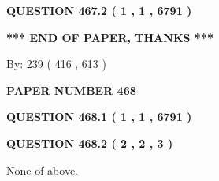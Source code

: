 \documentclass[12pt]{article}
\begin{document}
 
 
 
  
\vspace{0.2in}
  
{\textbf{\Large{QUESTION
467.2 
 ( 1 , 1 , 6791 )
}}}
  
  
   
   
 \vspace{0.2in}
 
   
   
   
   
\vspace{1.0in} 
{\textbf{\large{ *** END OF PAPER, THANKS *** }}} 
   
   
\hspace{1.0in} By: 
 239 ( 416 ,  613 )
   
   
   
   
\newpage 
\setcounter{page}{ 
   468001 } 
   
   
   
   
 {\textbf{ \Large{ PAPER NUMBER  468  }}}
   
   
\vspace{0.2in}
   
   
   
   
   
   
 \vspace{0.2in}
 
 
 
 
   
   
  
\vspace{0.2in}
  
{\textbf{\Large{QUESTION
468.1 
 ( 1 , 1 , 6791 )
}}}
  
  
  
\vspace{0.2in}
  
{\textbf{\Large{QUESTION
468.2 
 ( 2 , 2 , 3 )
}}}
  
  
 
 
\noindent{}
 
 
 None of above.
 
 
 
 
   
   
 \vspace{0.2in}
 
   
   
\end{document}
